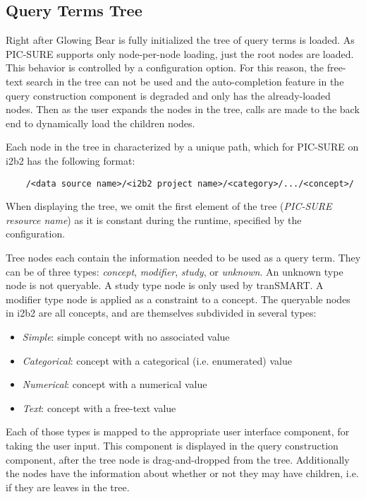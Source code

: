 
\subsection{Query Terms Tree}
\label{sec:design-tree}

Right after Glowing Bear is fully initialized the tree of query terms is loaded.
As PIC-SURE supports only node-per-node loading, just the root nodes are loaded. 
This behavior is controlled by a configuration option.
For this reason, the free-text search in the tree can not be used and the auto-completion feature in the query construction component is degraded and only has the already-loaded nodes.
Then as the user expands the nodes in the tree, calls are made to the back end to dynamically load the children nodes.

Each node in the tree in characterized by a unique path, which for PIC-SURE on i2b2 has the following format:
\begin{verbatim}
    /<data source name>/<i2b2 project name>/<category>/.../<concept>/
\end{verbatim}
When displaying the tree, we omit the first element of the tree (\emph{PIC-SURE resource name}) as it is constant during the runtime, specified by the configuration.

Tree nodes each contain the information needed to be used as a query term.
They can be of three types: \emph{concept}, \emph{modifier}, \emph{study}, or \emph{unknown}.
An unknown type node is not queryable. 
A study type node is only used by tranSMART.
A modifier type node is applied as a constraint to a concept.
The queryable nodes in i2b2 are all concepts, and are themselves subdivided in several types:
\begin{itemize}
    \setlength\itemsep{0em}
    \item \emph{Simple}: simple concept with no associated value
    \item \emph{Categorical}: concept with a categorical (i.e. enumerated) value
    \item \emph{Numerical}: concept with a numerical value
    \item \emph{Text}: concept with a free-text value
\end{itemize}
Each of those types is mapped to the appropriate user interface component, for taking the user input.
This component is displayed in the query construction component, after the tree node is drag-and-dropped from the tree.
Additionally the nodes have the information about whether or not they may have children, i.e. if they are leaves in the tree.


